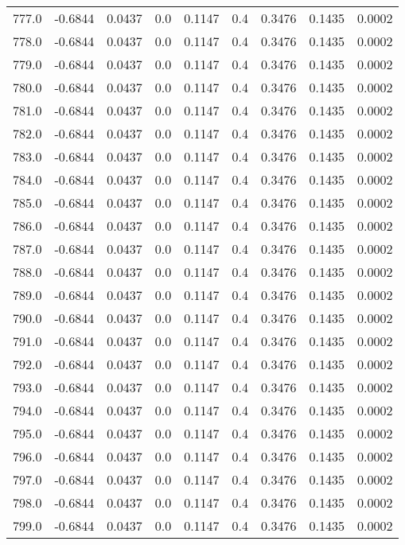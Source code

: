 \begin{longtable}{lrrrrrrrr}
777.0 & -0.6844 & 0.0437 & 0.0 & 0.1147 & 0.4 & 0.3476 & 0.1435 & 0.0002 \\
778.0 & -0.6844 & 0.0437 & 0.0 & 0.1147 & 0.4 & 0.3476 & 0.1435 & 0.0002 \\
779.0 & -0.6844 & 0.0437 & 0.0 & 0.1147 & 0.4 & 0.3476 & 0.1435 & 0.0002 \\
780.0 & -0.6844 & 0.0437 & 0.0 & 0.1147 & 0.4 & 0.3476 & 0.1435 & 0.0002 \\
781.0 & -0.6844 & 0.0437 & 0.0 & 0.1147 & 0.4 & 0.3476 & 0.1435 & 0.0002 \\
782.0 & -0.6844 & 0.0437 & 0.0 & 0.1147 & 0.4 & 0.3476 & 0.1435 & 0.0002 \\
783.0 & -0.6844 & 0.0437 & 0.0 & 0.1147 & 0.4 & 0.3476 & 0.1435 & 0.0002 \\
784.0 & -0.6844 & 0.0437 & 0.0 & 0.1147 & 0.4 & 0.3476 & 0.1435 & 0.0002 \\
785.0 & -0.6844 & 0.0437 & 0.0 & 0.1147 & 0.4 & 0.3476 & 0.1435 & 0.0002 \\
786.0 & -0.6844 & 0.0437 & 0.0 & 0.1147 & 0.4 & 0.3476 & 0.1435 & 0.0002 \\
787.0 & -0.6844 & 0.0437 & 0.0 & 0.1147 & 0.4 & 0.3476 & 0.1435 & 0.0002 \\
788.0 & -0.6844 & 0.0437 & 0.0 & 0.1147 & 0.4 & 0.3476 & 0.1435 & 0.0002 \\
789.0 & -0.6844 & 0.0437 & 0.0 & 0.1147 & 0.4 & 0.3476 & 0.1435 & 0.0002 \\
790.0 & -0.6844 & 0.0437 & 0.0 & 0.1147 & 0.4 & 0.3476 & 0.1435 & 0.0002 \\
791.0 & -0.6844 & 0.0437 & 0.0 & 0.1147 & 0.4 & 0.3476 & 0.1435 & 0.0002 \\
792.0 & -0.6844 & 0.0437 & 0.0 & 0.1147 & 0.4 & 0.3476 & 0.1435 & 0.0002 \\
793.0 & -0.6844 & 0.0437 & 0.0 & 0.1147 & 0.4 & 0.3476 & 0.1435 & 0.0002 \\
794.0 & -0.6844 & 0.0437 & 0.0 & 0.1147 & 0.4 & 0.3476 & 0.1435 & 0.0002 \\
795.0 & -0.6844 & 0.0437 & 0.0 & 0.1147 & 0.4 & 0.3476 & 0.1435 & 0.0002 \\
796.0 & -0.6844 & 0.0437 & 0.0 & 0.1147 & 0.4 & 0.3476 & 0.1435 & 0.0002 \\
797.0 & -0.6844 & 0.0437 & 0.0 & 0.1147 & 0.4 & 0.3476 & 0.1435 & 0.0002 \\
798.0 & -0.6844 & 0.0437 & 0.0 & 0.1147 & 0.4 & 0.3476 & 0.1435 & 0.0002 \\
799.0 & -0.6844 & 0.0437 & 0.0 & 0.1147 & 0.4 & 0.3476 & 0.1435 & 0.0002 \\

\end{longtable}
